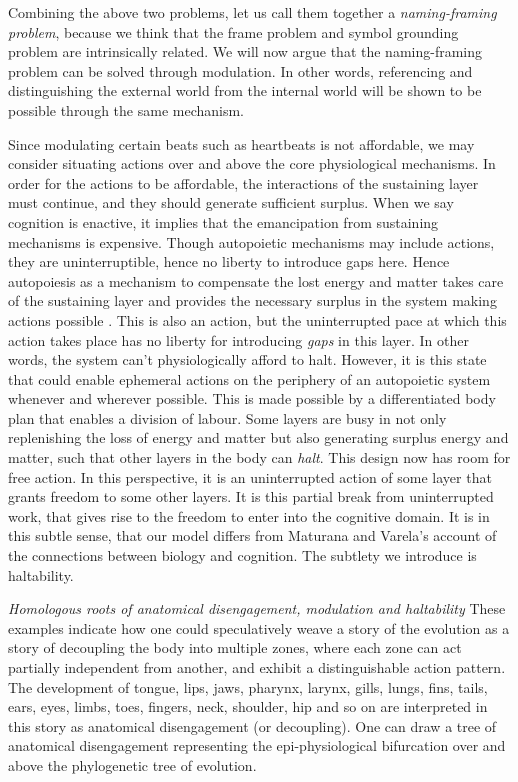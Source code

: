 Combining the above two problems, let us call them together a \textit{naming-framing problem}, because we think that the frame problem and symbol grounding problem are intrinsically related. 
We will now argue that the naming-framing problem can be solved through modulation. In other words, referencing and distinguishing the external world from the internal world will be shown to be possible through the same mechanism. 

 Since modulating certain beats such as heartbeats is not affordable, we may consider situating actions over and above the core physiological mechanisms. In order for the actions to be affordable, the interactions of the sustaining layer  must continue, and they should generate sufficient surplus. When we say cognition is enactive, it implies that the emancipation from sustaining mechanisms is expensive. Though autopoietic mechanisms may include actions, they are uninterruptible, hence no liberty to introduce gaps here. Hence autopoiesis as a mechanism to compensate the lost energy and matter takes care of the sustaining layer and provides the necessary surplus in the system making actions possible \cite{maturana1991autopoiesis}. This is also an action, but the uninterrupted pace at which this action takes place has no liberty for introducing \textit{gaps} in this layer. In other words, the system can't physiologically afford to halt. However, it is this state that could enable ephemeral actions on the periphery of an autopoietic system whenever and wherever possible. This is made possible by a differentiated body plan that enables a division of labour. Some layers are busy in not only replenishing the loss of energy and matter but also generating surplus energy and matter, such that other layers in the body can \textit{halt}. This design now has room for free action. In this perspective, it is an uninterrupted action of some layer that grants freedom to some other layers. It is this partial break from uninterrupted work, that gives rise to the freedom to enter into the cognitive domain. It is in this subtle sense, that our model differs from Maturana and Varela's account of the connections between biology and cognition. The subtlety we introduce is haltability. 

\emph{Homologous roots of anatomical disengagement, modulation and haltability} These examples indicate how one could speculatively weave a story of the evolution as a story of decoupling the body into multiple zones, where each zone can act partially independent from another, and exhibit a distinguishable action pattern. The development of tongue, lips, jaws, pharynx, larynx, gills, lungs, fins, tails, ears, eyes, limbs, toes, fingers, neck, shoulder, hip and so on are interpreted in this story as anatomical disengagement (or decoupling). One can draw a tree of anatomical disengagement representing the epi-physiological bifurcation over and above the phylogenetic tree of evolution. 

